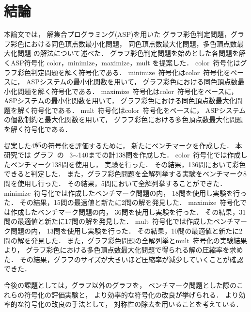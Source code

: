 \chapter{結論}
本論文では，
解集合プログラミング(ASP)を用いた
グラフ彩色判定問題，グラフ彩色における同色頂点数最小化問題，
同色頂点数最大化問題，多色頂点数最大化問題
の解法について述べた．
グラフ彩色判定問題を始めとした各問題を解くASP符号化
\textsf{color}，\textsf{minimize}，\textsf{maximize}，\textsf{mult}
を提案した．
\textsf{color}~符号化はグラフ彩色判定問題を解く符号化である．
\textsf{minimize}~符号化は\textsf{color}~符号化をベースに，
ASPシステムの最小化関数を用いて，
グラフ彩色における同色頂点数最小化問題を解く符号化である．
\textsf{maximize}~符号化は\textsf{color}~符号化をベースに，
ASPシステムの最小化関数を用いて，
グラフ彩色における同色頂点数最大化問題を解く符号化である．
\textsf{mult}~符号化は\textsf{color}~符号化をベースに，
ASPシステムの個数制約と最大化関数を用いて，
グラフ彩色における多色頂点数最大化問題を解く符号化である．

提案した4種の符号化を評価するために，
新たにベンチマークを作成した．
本研究では
グラフ~\cite{Knuth:TAOCP:SAT}の
~3$\sim$140までの計138問を作成した．
\textsf{color}~符号化では作成したベンチマーク138問を使用し，
実験を行った．
その結果，136問において彩色できると判定した．
また，グラフ彩色問題を全解列挙する実験をベンチマーク8問を使用し行った．
その結果，5問において全解列挙することができた．
\textsf{minimize}~符号化では作成したベンチマーク問題の内，
18問を使用し実験を行った．
その結果，15問の最適値と新たに2問の解を発見した．
\textsf{maximize}~符号化では作成したベンチマーク問題の内，
36問を使用し実験を行った．
その結果，31問の最適値と新たに17問の解を発見した．
\textsf{mult}~符号化では作成したベンチマーク問題の内，
13問を使用し実験を行った．
その結果，10問の最適値と新たに2問の解を発見した．
また，グラフ彩色問題の全解列挙と\textsf{mult}~符号化の実験結果より，
グラフ彩色における多色頂点数最大化問題で得られる解の圧縮率を求めた．
その結果，グラフのサイズが大きいほど圧縮率が減少していくことが確認できた．

今後の課題としては，グラフ以外のグラフを，
ベンチマーク問題とした際のこれらの符号化の評価実験と，
より効率的な符号化の改良が挙げられる．
より効率的な符号化の改良の手法として，
対称性の除去を用いることを考えている．


